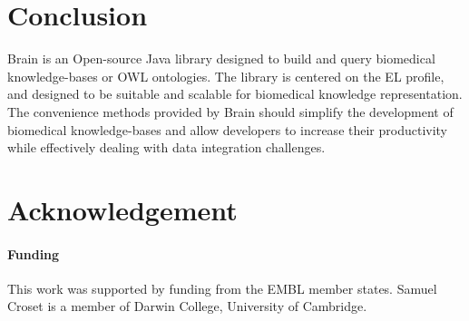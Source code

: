 \documentclass{bioinfo}
\begin{document}
\section{Conclusion}
Brain is an Open-source Java library designed to build and query biomedical knowledge-bases or OWL ontologies.
The library is centered on the EL profile, and designed to be suitable and scalable for biomedical knowledge representation.
The convenience methods provided by Brain should simplify the development of biomedical knowledge-bases and allow developers
to increase their productivity while effectively dealing with data integration challenges.

\section*{Acknowledgement}
\paragraph{Funding\textcolon}
This work was supported by funding from the EMBL member states. Samuel Croset is a member of Darwin College, University of Cambridge.

% 
% 
% 
% 
% 
% 
% 
% 
% 
\end{document}
